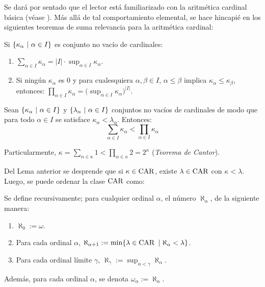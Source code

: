 Se dará por sentado que el lector está familiarizado con la aritmética cardinal básica (véase \cite[Cap.~1, \S ~ 3]{jechSet}). Más allá de tal comportamiento elemental, se hace hincapié en los siguientes teoremas de suma relevancia para la aritmética cardinal:
\begin{teorema}
	Si $\{\kappa_\alpha \text{ $|$ } \alpha \in I\}$ es conjunto no vacío de cardinales:
	\begin{enumerate}
		\item $\displaystyle \sum_{\alpha \in I} \kappa_\alpha = |I| \cdot \sup_{\alpha \in I} \kappa_\alpha$.
		\item Si ningún $\kappa_\alpha$ es $0$ y para cualesquiera $\alpha,\beta \in I$, $\alpha \leq \beta$ implica $\kappa_\alpha \leq \kappa_\beta$, entonces: $\displaystyle \prod_{\alpha \in I} \kappa_\alpha = \Big( \sup_{\alpha \in I} \kappa_\alpha \Big)^{|I|}$.
	\end{enumerate}
\end{teorema}

\begin{teorema}
	Sean $\{\kappa_\alpha \text{ $|$ } \alpha \in I\}$ y $\{\lambda_\alpha \text{ $|$ } \alpha \in I\}$ conjuntos no vacíos de cardinales de modo que para todo $\alpha \in I$ se satisface $\kappa_\alpha < \lambda_\alpha$. Entonces:
	\[ \sum_{\alpha \in I} \kappa_\alpha < \prod_{\alpha \in I} \kappa_\alpha \]

	Particularmente, $\kappa = \sum_{\alpha \in \kappa} 1 < \prod_{\alpha \in \kappa} 2 = 2^\kappa$ (\textit{Teorema de Cantor}).
\end{teorema}

Del Lema anterior se desprende que si $\kappa \in \operatorname{CAR}$, existe $\lambda \in \operatorname{CAR}$ con $\kappa < \lambda$. Luego, se puede ordenar la clase $\operatorname{CAR}$ como:
\begin{definicion}\index[sym]{$\aleph_\alpha$}\index[sym]{$\omega_\alpha$}
	Se define recursivamente; para cualquier ordinal $\alpha$, el número $\aleph_\alpha$, de la siguiente manera:
	\begin{enumerate}
		\item $\aleph_0:=\omega$.
		\item Para cada ordinal $\alpha$, $\aleph_{\alpha+1}:=\min\{ \lambda \in \operatorname{CAR} \text{ $|$ } \aleph_\alpha < \lambda \}$.
		\item Para cada ordinal límite $\gamma$, $\aleph_\gamma:=\sup_{\alpha < \gamma} \aleph_\alpha$.
	\end{enumerate}

	Además, para cada ordinal $\alpha$, se denota $\omega_\alpha:=\aleph_\alpha$.
\end{definicion}

